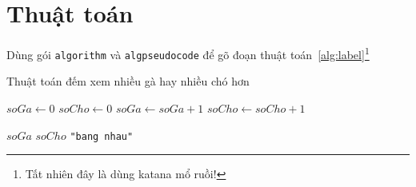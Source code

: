 \section{Thuật toán}
Dùng gói \texttt{algorithm} và \texttt{algpseudocode} để gõ đoạn thuật toán~\ref{alg:label}\footnote{Tất nhiên đây là dùng katana mổ ruồi!}

\begin{algorithm}
\caption{Thuật toán đếm xem nhiều gà hay nhiều chó hơn}
\label{alg:label}
\begin{algorithmic}
\State $soGa \gets 0$
\State $soCho \gets 0$
\State $soGa \gets soGa + 1$
\EndFor
{}
\State $soCho \gets soCho + 1$
\EndFor

\State\Return $soGa$
\State\Return $soCho$
\Else 
\State\Return \texttt{"bang nhau"}
\EndIf
\EndFunction
\end{algorithmic}
\end{algorithm}